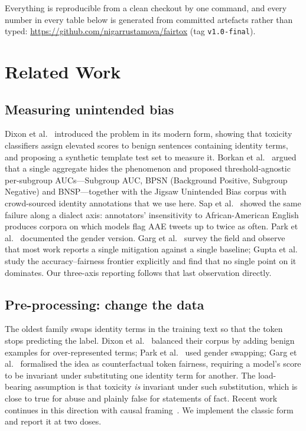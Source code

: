 \documentclass[conference]{IEEEtran}
\newcommand{\repourl}{https://github.com/nigarrustamova/fairtox}
\newcommand{\repotag}{v1.0-final}
\begin{document}
Everything is reproducible from a clean checkout by one command, and every number
in every table below is generated from committed artefacts rather than typed:
\url{\repourl} (tag \texttt{\repotag}).

\section{Related Work}

\subsection{Measuring unintended bias}
Dixon et al.~\cite{dixon2018} introduced the problem in its modern form, showing
that toxicity classifiers assign elevated scores to benign sentences containing
identity terms, and proposing a synthetic template test set to measure it.
Borkan et al.~\cite{borkan2019} argued that a single aggregate hides the
phenomenon and proposed threshold-agnostic per-subgroup AUCs---Subgroup AUC,
BPSN (Background Positive, Subgroup Negative) and BNSP---together with the
Jigsaw Unintended Bias corpus with crowd-sourced identity annotations that we use
here. Sap et al.~\cite{sap2019} showed the same failure along a dialect axis:
annotators' insensitivity to African-American English produces corpora on which
models flag AAE tweets up to twice as often. Park et al.~\cite{park2018}
documented the gender version. Garg et al.~\cite{garg2023} survey the field and
observe that most work reports a single mitigation against a single baseline;
Gupta et al.~\cite{gupta2025} study the accuracy--fairness frontier explicitly
and find that no single point on it dominates. Our three-axis reporting follows
that last observation directly.

\subsection{Pre-processing: change the data}
The oldest family swaps identity terms in the training text so that the token
stops predicting the label. Dixon et al.~\cite{dixon2018} balanced their corpus
by adding benign examples for over-represented terms; Park et al.~\cite{park2018}
used gender swapping; Garg et al.~\cite{garg2019} formalised the idea as
counterfactual token fairness, requiring a model's score to be invariant under
substituting one identity term for another. The load-bearing assumption is that
toxicity \emph{is} invariant under such substitution, which is close to true for
abuse and plainly false for statements of fact. Recent work continues in this
direction with causal framing~\cite{lu2024}. We implement the classic form and
report it at two doses.
\end{document}
